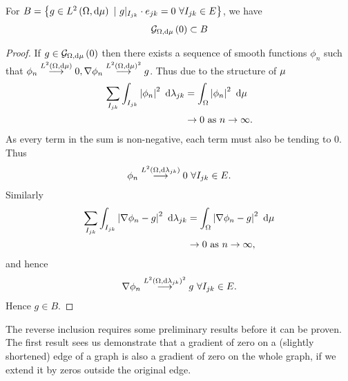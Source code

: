 \begin{prop} \label{prop:Grad0IncB}
	For $B = \clbracs{g\in\ltwo{\ddom}{\ddmes} \ \vert \ g\vert_{I_{jk}}\cdot e_{jk}=0 \ \forall I_{jk}\in E}$, we have
	\begin{align*}
		\mathcal{G}_{ \Omega, \mathrm{d}\mu}\left( 0 \right) \subset B
	\end{align*}
\end{prop}
\begin{proof}
	If $g\in\mathcal{G}_{ \Omega, \mathrm{d}\mu}\left( 0 \right)$ then there exists a sequence of smooth functions $\phi_n$ such that $\phi_n\overset{L^{2}\left( \Omega,\mathrm{d}\mu \right)}{\longrightarrow}0, \nabla\phi_n\overset{L^{2}\left( \Omega,\mathrm{d}\mu \right)^2}{\longrightarrow}g$.
	Thus due to the structure of $\mu$
	\begin{align*}
		\sum_{I_{jk}}\int_{I_{jk}}\left\lvert \phi_n \right\rvert^2 \ \mathrm{d}\lambda_{jk} &= \int_{\Omega}\left\lvert \phi_n \right\rvert^2 \ \mathrm{d}\mu \\
		&\rightarrow 0 \ \text{as} \ n \rightarrow\infty.
	\end{align*}
	As every term in the sum is non-negative, each term must also be tending to 0.
	Thus 
	\begin{align*}
		\phi_n\overset{L^{2}\left( \Omega,\mathrm{d}\lambda_{jk} \right)}{\longrightarrow}0 \ \forall I_{jk}\in E.
	\end{align*}
	Similarly
	\begin{align*}
		\sum_{I_{jk}}\int_{I_{jk}}\left\lvert \nabla\phi_n - g \right\rvert^2 \ \mathrm{d}\lambda_{jk} &= \int_{\Omega}\left\lvert \nabla\phi_n - g \right\rvert^2 \ \mathrm{d}\mu \\
		&\rightarrow 0 \ \text{as} \ n \rightarrow\infty,
	\end{align*}	
	and hence 
	\begin{align*}
		\nabla\phi_n\overset{L^{2}\left( \Omega,\mathrm{d}\lambda_{jk} \right)^2}{\longrightarrow} g \ \forall I_{jk}\in E.
	\end{align*}
	Hence $g\in B$.
\end{proof}

The reverse inclusion requires some preliminary results before it can be proven.
The first result sees us demonstrate that a gradient of zero on a (slightly shortened) edge of a graph is also a gradient of zero on the whole graph, if we extend it by zeros outside the original edge.

